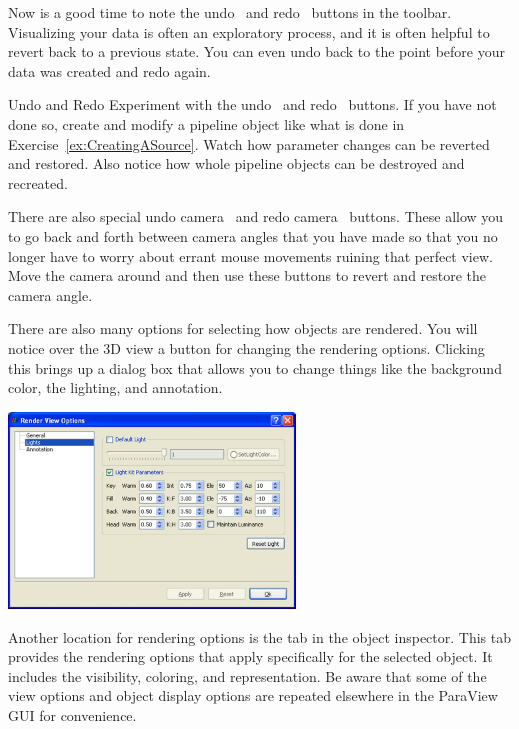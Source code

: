Now is a good time to note the undo~ and
redo~ buttons in the toolbar.  Visualizing your data is
often an exploratory process, and it is often helpful to revert back to a
previous state.  You can even undo back to the point before your data was
created and redo again.

\begin{exercise}{Undo and Redo}
  \label{ex:UndoAndRedo}
  Experiment with the undo~ and redo~
  buttons.  If you have not done so, create and modify a pipeline object
  like what is done in Exercise~\ref{ex:CreatingASource}.  Watch how
  parameter changes can be reverted and restored.  Also notice how whole
  pipeline objects can be destroyed and recreated.

  There are also special undo camera~ and redo
  camera~ buttons.  These allow you to go back and
  forth between camera angles that you have made so that you no longer have
  to worry about errant mouse movements ruining that perfect view.  Move
  the camera around and then use these buttons to revert and restore the
  camera angle.
\end{exercise}

There are also many options for selecting how objects are rendered.  You
will notice over the 3D view a  button for changing the
rendering options.  Clicking this brings up a dialog box that allows you to
change things like the background color, the lighting, and annotation.

\begin{inlinefig}
  \includegraphics[width=3in]{images/RenderViewOptions}
\end{inlinefig}

Another location for rendering options is the  tab in the
object inspector.  This tab provides the rendering options that apply
specifically for the selected object.  It includes the visibility,
coloring, and representation.  Be aware that some of the view options and
object display options are repeated elsewhere in the ParaView GUI for
convenience.


